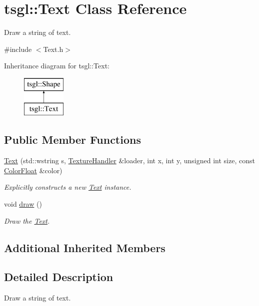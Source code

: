 \hypertarget{classtsgl_1_1_text}{}\section{tsgl\+:\+:Text Class Reference}
\label{classtsgl_1_1_text}


Draw a string of text.  




{\ttfamily \#include $<$Text.\+h$>$}

Inheritance diagram for tsgl\+:\+:Text\+:\begin{figure}[H]
\begin{center}
\leavevmode
\includegraphics[height=2.000000cm]{classtsgl_1_1_text}
\end{center}
\end{figure}
\subsection*{Public Member Functions}
\begin{DoxyCompactItemize}
\item 
\hyperlink{classtsgl_1_1_text_a9f903a24af7fd62666b7532c1fa2d182}{Text} (std\+::wstring s, \hyperlink{classtsgl_1_1_texture_handler}{Texture\+Handler} \&loader, int x, int y, unsigned int size, const \hyperlink{structtsgl_1_1_color_float}{Color\+Float} \&color)
\begin{DoxyCompactList}\small\item\em Explicitly constructs a new \hyperlink{classtsgl_1_1_text}{Text} instance. \end{DoxyCompactList}\item 
void \hyperlink{classtsgl_1_1_text_a9dc47e4af682abfdab74e37b71f9fbde}{draw} ()
\begin{DoxyCompactList}\small\item\em Draw the \hyperlink{classtsgl_1_1_text}{Text}. \end{DoxyCompactList}\end{DoxyCompactItemize}
\subsection*{Additional Inherited Members}


\subsection{Detailed Description}
Draw a string of text. 

